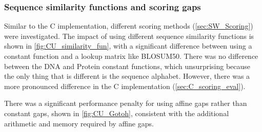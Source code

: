 \subsubsection{Sequence similarity functions and scoring gaps}
\label{sec:CUDA_scoring_eval}

Similar to the C implementation, different scoring methods (\cref{sec:SW_Scoring}) were investigated.
The impact of using different sequence similarity functions is shown in \cref{fig:CU_similarity_fun}, with a significant difference between using a constant function and a lookup matrix like BLOSUM50.
There was no difference between the DNA and Protein constant functions, which unsurprising because the only thing that is different is the sequence alphabet.
However, there was a more pronounced difference in the C implementation (\cref{sec:C_scoring_eval}).

There was a significant performance penalty for using affine gaps rather than constant gaps, shown in \cref{fig:CU_Gotoh}, consistent with the additional arithmetic and memory required by affine gaps.


